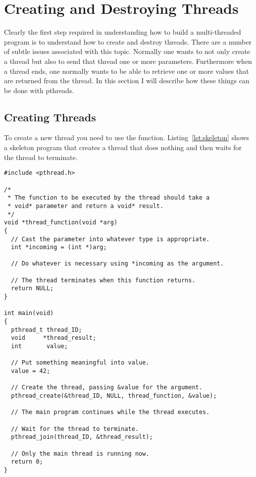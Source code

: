 
\section{Creating and Destroying Threads}
\label{sec:createdestroy-threads}

Clearly the first step required in understanding how to build a multi-threaded program is to
understand how to create and destroy threads. There are a number of subtle issues associated
with this topic. Normally one wants to not only create a thread but also to send that thread one
or more parameters. Furthermore when a thread ends, one normally wants to be able to retrieve
one or more values that are returned from the thread. In this section I will describe how these
things can be done with pthreads.

\subsection{Creating Threads}
\label{subsec:creating-threads}

To create a new thread you need to use the  function.
Listing~\ref{lst:skeleton} shows a skeleton program that creates a thread that does nothing and
then waits for the thread to terminate.

\begin{lstlisting}[float=tp,frame=single,xleftmargin=0in,
  caption={Skeleton Thread Program},label=lst:skeleton]  
#include <pthread.h>

/*
 * The function to be executed by the thread should take a
 * void* parameter and return a void* result.
 */
void *thread_function(void *arg)
{
  // Cast the parameter into whatever type is appropriate.
  int *incoming = (int *)arg;

  // Do whatever is necessary using *incoming as the argument.

  // The thread terminates when this function returns.
  return NULL;
}

int main(void)
{
  pthread_t thread_ID;
  void     *thread_result;
  int       value;

  // Put something meaningful into value.
  value = 42;

  // Create the thread, passing &value for the argument.
  pthread_create(&thread_ID, NULL, thread_function, &value);

  // The main program continues while the thread executes.

  // Wait for the thread to terminate.
  pthread_join(thread_ID, &thread_result);

  // Only the main thread is running now.
  return 0;
}
\end{lstlisting}


